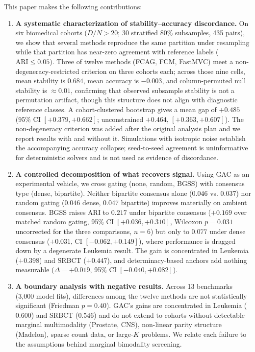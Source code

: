 \documentclass[pdflatex,sn-mathphys-num]{sn-jnl}
\theoremstyle{thmstyleone}
\theoremstyle{thmstyletwo}
\theoremstyle{thmstylethree}
\begin{document}
This paper makes the following contributions:
\begin{enumerate}
 \item \textbf{A systematic characterization of stability--accuracy discordance.} On six biomedical cohorts ($D/N > 20$; 30 stratified $80\%$ subsamples, 435 pairs), we show that several methods reproduce the same partition under resampling while that partition has near-zero agreement with reference labels ($\text{ARI} \le 0.05$). Three of twelve methods (FCAG, FCM, FastMVC) meet a non-degeneracy-restricted criterion on three cohorts each; across those nine cells, mean stability is $0.684$, mean accuracy is $-0.003$, and column-permuted null stability is $\approx 0.01$, confirming that observed subsample stability is not a permutation artifact, though this structure does not align with diagnostic reference classes. A cohort-clustered bootstrap gives a mean gap of $+0.485$ (95\% CI $[+0.379, +0.662]$; unconstrained $+0.464$, $[+0.363, +0.607]$). The non-degeneracy criterion was added after the original analysis plan and we report results with and without it. Simulations with isotropic noise establish the accompanying accuracy collapse; seed-to-seed agreement is uninformative for deterministic solvers and is not used as evidence of discordance.

 \item \textbf{A controlled decomposition of what recovers signal.} Using GAC as an experimental vehicle, we cross gating (none, random, BGSS) with consensus type (dense, bipartite). Neither bipartite consensus alone ($0.046$ vs. $0.037$) nor random gating ($0.046$ dense, $0.047$ bipartite) improves materially on ambient consensus. BGSS raises ARI to $0.217$ under bipartite consensus ($+0.169$ over matched random gating, 95\% CI $[+0.036, +0.310]$, Wilcoxon $p = 0.031$ uncorrected for the three comparisons, $n = 6$) but only to $0.077$ under dense consensus ($+0.031$, CI $[-0.062, +0.149]$), where performance is dragged down by a degenerate Leukemia result. The gain is concentrated in Leukemia ($+0.398$) and SRBCT ($+0.447$), and determinacy-based anchors add nothing measurable ($\Delta = +0.019$, 95\% CI $[-0.040, +0.082]$).

\item \textbf{A boundary analysis with negative results.} Across 13 benchmarks (3,000 model fits), differences among the twelve methods are not statistically significant (Friedman $p = 0.40$). GAC's gains are concentrated in Leukemia ($0.600$) and SRBCT ($0.546$) and do not extend to cohorts without detectable marginal multimodality (Prostate, CNS), non-linear parity structure (Madelon), sparse count data, or large-$K$ problems. We relate each failure to the assumptions behind marginal bimodality screening.


\end{enumerate}
\end{document}

